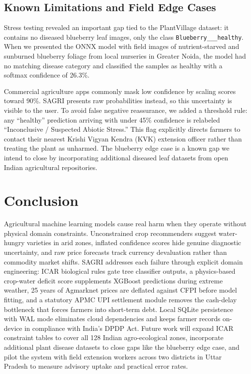 \documentclass[conference]{IEEEtran}
\begin{document}
\subsection{Known Limitations and Field Edge Cases}
Stress testing revealed an important gap tied to the PlantVillage dataset: it contains no diseased blueberry leaf images, only the class \texttt{Blueberry\_\_\_healthy}. When we presented the ONNX model with field images of nutrient-starved and sunburned blueberry foliage from local nurseries in Greater Noida, the model had no matching disease category and classified the samples as healthy with a softmax confidence of 26.3\%.

Commercial agriculture apps commonly mask low confidence by scaling scores toward 90\%. SAGRI presents raw probabilities instead, so this uncertainty is visible to the user. To avoid false negative reassurance, we added a threshold rule: any ``healthy'' prediction arriving with under 45\% confidence is relabeled ``Inconclusive / Suspected Abiotic Stress.'' This flag explicitly directs farmers to contact their nearest Krishi Vigyan Kendra (KVK) extension officer rather than treating the plant as unharmed. The blueberry edge case is a known gap we intend to close by incorporating additional diseased leaf datasets from open Indian agricultural repositories.

\section{Conclusion}
Agricultural machine learning models cause real harm when they operate without physical domain constraints. Unconstrained crop recommenders suggest water-hungry varieties in arid zones, inflated confidence scores hide genuine diagnostic uncertainty, and raw price forecasts track currency devaluation rather than commodity market shifts. SAGRI addresses each failure through explicit domain engineering: ICAR biological rules gate tree classifier outputs, a physics-based crop-water deficit score supplements XGBoost predictions during extreme weather, 25 years of Agmarknet prices are deflated against CFPI before model fitting, and a statutory APMC UPI settlement module removes the cash-delay bottleneck that forces farmers into short-term debt. Local SQLite persistence with WAL mode eliminates cloud dependencies and keeps farmer records on-device in compliance with India's DPDP Act. Future work will expand ICAR constraint tables to cover all 128 Indian agro-ecological zones, incorporate additional plant disease datasets to close gaps like the blueberry edge case, and pilot the system with field extension workers across two districts in Uttar Pradesh to measure advisory uptake and practical error rates.
\end{document}
